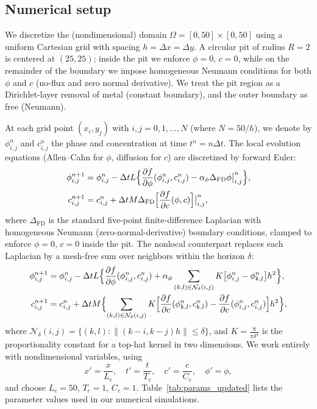 \documentclass[]{article}
\begin{document}
\subsection{Numerical setup}

We discretize the (nondimensional) domain $\Omega = [0,50]\times[0,50]$ using a uniform Cartesian grid with spacing $h=\Delta x=\Delta y$. A circular pit of radius $R=2$ is centered at $(25,25)$; inside the pit we enforce $\phi=0$, $c=0$, while on the remainder of the boundary we impose homogeneous Neumann conditions for both $\phi$ and $c$ (no-flux and zero normal derivative). We treat the pit region as a Dirichlet-layer removal of metal (constant boundary), and the outer boundary as free (Neumann).  

At each grid point $(x_{i},y_{j})$ with $i,j=0,1,\ldots,N$ (where $N=50/h$), we denote by $\phi_{i,j}^{n}$ and $c_{i,j}^{n}$ the phase and concentration at time $t^{n}=n\Delta t$. The local evolution equations (Allen--Cahn for $\phi$, diffusion for $c$) are discretized by forward Euler:
\[
\begin{aligned}
	\phi_{i,j}^{n+1}
	&= \phi_{i,j}^{n} 
	- \Delta t L \Bigl\{\frac{\partial f}{\partial \phi}(\phi_{i,j}^{n},c_{i,j}^{n}) 
	- \alpha_{\phi}\Delta_{\text{FD}}\phi\bigl|_{i,j}^{n}\Bigr\},\\
	c_{i,j}^{n+1}
	&= c_{i,j}^{n}
	+ \Delta t M \Delta_{\text{FD}}\Bigl[\frac{\partial f}{\partial c}(\phi,c)\Bigr]\bigl|_{i,j}^{n},
\end{aligned}
\]
where $\Delta_{\text{FD}}$ is the standard five-point finite-difference Laplacian with homogeneous Neumann (zero-normal-derivative) boundary conditions, clamped to enforce $\phi=0$, $c=0$ inside the pit.  The nonlocal counterpart replaces each Laplacian by a mesh-free sum over neighbors within the horizon $\delta$:
\[
\begin{aligned}
	\phi_{i,j}^{n+1}
	&= \phi_{i,j}^{n} 
	- \Delta t L \Bigl\{\frac{\partial f}{\partial \phi}(\phi_{i,j}^{n},c_{i,j}^{n}) 
	+ \alpha_{\phi}
	\sum_{(k,l)\in\mathcal{N}_{\delta}(i,j)}
	K\bigl[\phi_{i,j}^{n}-\phi_{k,l}^{n}\bigr]h^{2}\Bigr\},\\
	c_{i,j}^{n+1}
	&= c_{i,j}^{n}
	+ \Delta t M \Bigl\{
	\sum_{(k,l)\in\mathcal{N}_{\delta}(i,j)}
	K\Bigl[\frac{\partial f}{\partial c}(\phi_{k,l}^{n},c_{k,l}^{n})
	- \frac{\partial f}{\partial c}(\phi_{i,j}^{n},c_{i,j}^{n})\Bigr]h^{2}
	\Bigr\},
\end{aligned}
\]
where $\mathcal{N}_{\delta}(i,j)=\{(k,l):\|(k-i,k-j)h\|\le\delta\}$, and $K =\frac{8}{\pi\delta^{4}}$ is the proportionality constant for a top-hat kernel in two dimensions. We work entirely with nondimensional variables, using
\[
x'=\frac{x}{L_{c}},\quad t'=\frac{t}{T_{c}},\quad
c'=\frac{c}{C_{c}},\quad\phi'=\phi,
\]
and choose $L_{c}=50$, $T_{c}=1$, $C_{c}=1$.  Table~\ref{tab:params_updated} lists the parameter values used in our numerical simulations.  
\end{document}
